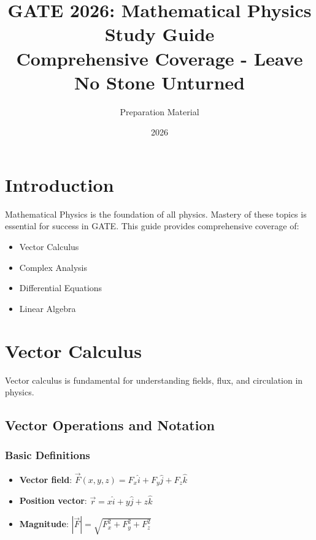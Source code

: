 \documentclass[12pt,a4paper]{article}
\title{\textbf{GATE 2026: Mathematical Physics Study Guide}\\
\large Comprehensive Coverage - Leave No Stone Unturned}
\author{Preparation Material}
\date{2026}
\begin{document}
\maketitle
\tableofcontents
\newpage

\section{Introduction}
Mathematical Physics is the foundation of all physics. Mastery of these topics is essential for success in GATE. This guide provides comprehensive coverage of:
\begin{itemize}
    \item Vector Calculus
    \item Complex Analysis
    \item Differential Equations
    \item Linear Algebra
\end{itemize}

\newpage

\section{Vector Calculus}
Vector calculus is fundamental for understanding fields, flux, and circulation in physics.

\subsection{Vector Operations and Notation}
\subsubsection{Basic Definitions}
\begin{itemize}
    \item \textbf{Vector field}: $\vec{F}(x,y,z) = F_x\hat{i} + F_y\hat{j} + F_z\hat{k}$
    \item \textbf{Position vector}: $\vec{r} = x\hat{i} + y\hat{j} + z\hat{k}$
    \item \textbf{Magnitude}: $|\vec{F}| = \sqrt{F_x^2 + F_y^2 + F_z^2}$
\end{itemize}
\end{document}
